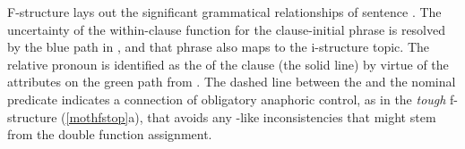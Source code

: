 \documentclass[output=paper,hidelinks]{langscibook}
\begin{document}
\ea \label{rel20}
            \label{elected}
            \label{relnowonder}
            \label{reportheight}
            \label{shop}
\z\z



F-structure  lays out the significant grammatical relationships of sentence .  The uncertainty of the within-clause function for the clause-initial phrase is resolved by the blue \OBJ path in , and that phrase also maps to the i-structure topic.  The relative pronoun is identified as the  of the clause (the solid line) by virtue of the attributes on the green path from .  The dashed line between the  and the nominal predicate indicates a connection of obligatory anaphoric control, as in the \textit{tough} f-structure (\ref{mothfstop}a), that avoids any \CASE-like inconsistencies that might stem from the double function assignment.
\end{document}
